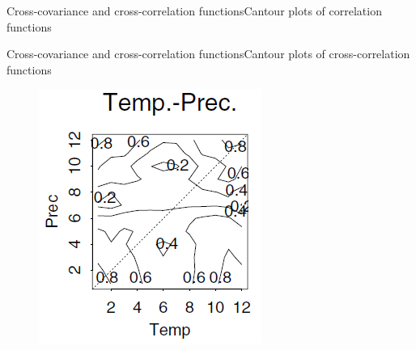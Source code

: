 \documentclass{beamer}
\begin{document}
\begin{frame}{Cross-covariance and cross-correlation functions}{Cantour plots of correlation functions}
\begin{multicols}{2}
\begin{figure}[h]
\begin{center}
		\end{center}
		\label{fig:long}
		\label{fig:onecol}
	\end{figure}
\end{multicols}
\end{frame}

\begin{frame}{Cross-covariance and cross-correlation functions}{Cantour plots of cross-correlation functions}
\begin{multicols}{2}
	\begin{figure}[h] %
		\begin{center}
			\includegraphics[width=0.9\linewidth]{img/12.png}
		\end{center}
		\label{fig:long}
		\label{fig:onecol}
	\end{figure}
	\begin{figure}[h] %
		\begin{center}

\end{center}
\end{figure}
\end{multicols}
\end{frame}
\end{document}
